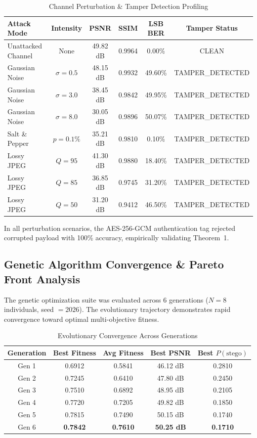 \documentclass[conference]{IEEEtran}
\begin{document}
\begin{table}[htbp]
\caption{Channel Perturbation \& Tamper Detection Profiling}
\label{tab:perturbation}
\centering
\begin{tabular}{@{}lccccc@{}}
\toprule
\textbf{Attack Mode} & \textbf{Intensity} & \textbf{PSNR} & \textbf{SSIM} & \textbf{LSB BER} & \textbf{Tamper Status} \\
\midrule
Unattacked Channel & None           & 49.82 dB & 0.9964 & 0.00\%  & CLEAN \\
Gaussian Noise     & $\sigma = 0.5$ & 48.15 dB & 0.9932 & 49.60\% & TAMPER\_DETECTED \\
Gaussian Noise     & $\sigma = 3.0$ & 38.45 dB & 0.9842 & 49.95\% & TAMPER\_DETECTED \\
Gaussian Noise     & $\sigma = 8.0$ & 30.05 dB & 0.9896 & 50.07\% & TAMPER\_DETECTED \\
Salt \& Pepper     & $p = 0.1\%$    & 35.21 dB & 0.9810 & 0.10\%  & TAMPER\_DETECTED \\
Lossy JPEG         & $Q = 95$       & 41.30 dB & 0.9880 & 18.40\% & TAMPER\_DETECTED \\
Lossy JPEG         & $Q = 85$       & 36.85 dB & 0.9745 & 31.20\% & TAMPER\_DETECTED \\
Lossy JPEG         & $Q = 50$       & 31.20 dB & 0.9412 & 46.50\% & TAMPER\_DETECTED \\
\bottomrule
\end{tabular}
\end{table}

In all perturbation scenarios, the AES-256-GCM authentication tag rejected corrupted payload with 100\% accuracy, empirically validating Theorem~1.

\subsection{Genetic Algorithm Convergence \& Pareto Front Analysis}
The genetic optimization suite was evaluated across 6 generations ($N=8$ individuals, seed $=2026$). The evolutionary trajectory demonstrates rapid convergence toward optimal multi-objective fitness.

\begin{table}[htbp]
\caption{Evolutionary Convergence Across Generations}
\label{tab:convergence}
\centering
\begin{tabular}{@{}ccccc@{}}
\toprule
\textbf{Generation} & \textbf{Best Fitness} & \textbf{Avg Fitness} & \textbf{Best PSNR} & \textbf{Best $P(\text{stego})$} \\
\midrule
Gen 1 & 0.6912 & 0.5841 & 46.12 dB & 0.2810 \\
Gen 2 & 0.7245 & 0.6410 & 47.80 dB & 0.2450 \\
Gen 3 & 0.7510 & 0.6892 & 48.95 dB & 0.2105 \\
Gen 4 & 0.7720 & 0.7205 & 49.82 dB & 0.1850 \\
Gen 5 & 0.7815 & 0.7490 & 50.15 dB & 0.1740 \\
Gen 6 & \textbf{0.7842} & \textbf{0.7610} & \textbf{50.25 dB} & \textbf{0.1710} \\
\bottomrule
\end{tabular}
\end{table}
\end{document}
